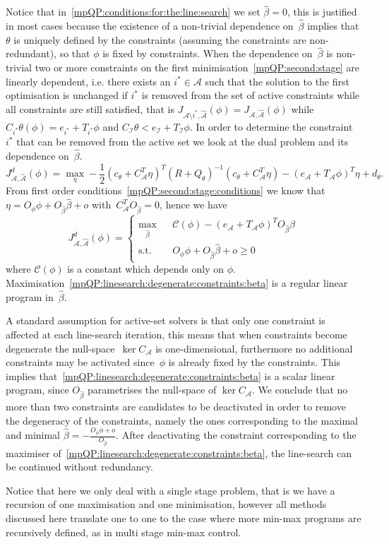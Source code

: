 Notice that in~\eqref{mpQP:conditions:for:the:line:search} we set $\hat \beta=0$, this is justified in
most cases because the existence of a non-trivial dependence on~$\hat\beta$ implies that $\theta$ is uniquely
defined by the constraints (assuming the constraints are non-redundant), so that $\phi$ is fixed by constraints.
%
When the dependence on~$\hat\beta$ is non-trivial two or more constraints on the first minimisation~\eqref{mpQP:second:stage}
are linearly dependent,
% 
i.e. there exists an $i^\ast\in\mathcal A$ such that the solution
to the first optimisation is unchanged if $i^\ast$ is removed from the set of active constraints while all
constraints are still satisfied, that is $J_{\mathcal A\setminus i^\ast,\hat{\mathcal A}}(\phi)=J_{\mathcal A,\hat{\mathcal A}}(\phi)$
while $C_{i^\ast}\theta(\phi)=e_{i^\ast}+T_{i^\ast}\phi$ and $C_{\mathcal I}\theta<e_{\mathcal I}+T_{\mathcal I}\phi$.
%
In order to determine the constraint~$i^\ast$ that can be removed from the active set we look at the dual
problem and its dependence on~$\hat\beta$.
%
\begin{equation}
	J_{\mathcal A,\hat{\mathcal A}}^d(\phi) = \max_\eta -\frac{1}{2} (c_\theta+C^T_{\mathcal A}\eta)^T(R+Q_\theta)^{-1}
	(c_\theta+C^T_{\mathcal A}\eta)-(e_{\mathcal A}+T_{\mathcal A}\phi)^T \eta+ d_\theta.
\end{equation}
%
From first order conditions~\eqref{mpQP:second:stage:conditions} we know that 
$\eta = O_\phi\phi+O_{\hat\beta}\hat\beta+o$ with~$C^T_{\mathcal A}O_{\hat\beta}=0$, hence we have
%
\begin{equation}\label{mpQP:linesearch:degenerate:constraints:beta}
	J_{\mathcal A,\hat{\mathcal A}}^d(\phi) = \left\{\begin{array}{rcl}
	\max_{\hat\beta}& &\mathcal C(\phi) -(e_{\mathcal A}+T_{\mathcal A} \phi)^TO_{\hat\beta}\hat\beta\\
	\text{s.t.}& &O_\phi\phi+O_{\hat\beta}\hat\beta+o\geq0
	\end{array}\right.
\end{equation}
where $\mathcal C(\phi)$ is a constant which depends only on $\phi$. 
%
Maximisation~\eqref{mpQP:linesearch:degenerate:constraints:beta} is a regular linear program in~$\hat\beta$.


A standard assumption for active-set solvers is that only one constraint is affected at each line-search
iteration, this means that when constraints become degenerate the null-space~$\ker C_{\mathcal A}$ is
one-dimensional, furthermore no additional constraints may be activated since~$\phi$ is already fixed by
the constraints.
%
This implies that~\eqref{mpQP:linesearch:degenerate:constraints:beta} is a scalar linear program, since
$O_{\hat\beta}$ parametrises the null-space of $\ker C_{\mathcal A}$.
%
We conclude that no more than two constraints are candidates to be deactivated in order to remove the degeneracy
of the constraints, namely the ones corresponding to the maximal and minimal $\hat\beta=
-\frac{O_\phi\phi+o}{O_{\hat\beta}}$.
%
After deactivating the constraint corresponding to the maximiser of~\eqref{mpQP:linesearch:degenerate:constraints:beta},
the line-search can be continued without redundancy.


Notice that here we only deal with a single stage problem, that is we have a recursion of one
maximisation and one minimisation, however all methods discussed here translate one to one to the
case where more min-max programs are recursively defined, as in multi stage min-max control.